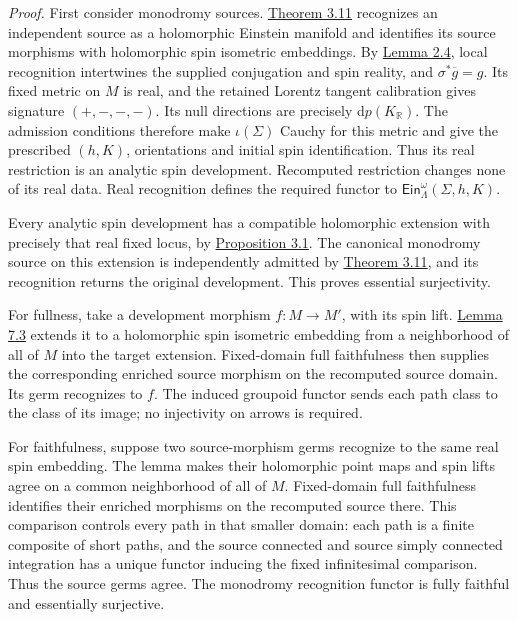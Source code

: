 \documentclass[
  english,
  11pt,
  reqno]{amsart}
\newcounter{none} %
\begin{document}
\emph{Proof.} First consider monodromy sources.
\hyperref[thm:independent-monodromy-equivalence]{Theorem 3.11}
recognizes an independent source as a holomorphic Einstein manifold and
identifies its source morphisms with holomorphic spin isometric
embeddings. By
\hyperref[lem:independent-ray-lorentz-recognition-v092]{Lemma 2.4},
local recognition intertwines the supplied conjugation and spin reality,
and \(\sigma^*\overline g=g\). Its fixed metric on \(M\) is real, and
the retained Lorentz tangent calibration gives signature \((+,-,-,-)\).
Its null directions are precisely \(\mathrm dp(K_{\mathbb R})\). The
admission conditions therefore make \(\iota(\Sigma)\) Cauchy for this
metric and give the prescribed \((h,K)\), orientations and initial spin
identification. Thus its real restriction is an analytic spin
development. Recomputed restriction changes none of its real data. Real
recognition defines the required functor to
\(\mathsf{Ein}^{\omega}_\Lambda(\Sigma,h,K)\).

Every analytic spin development has a compatible holomorphic extension
with precisely that real fixed locus, by
\hyperref[prop:einstein-complexification-phase]{Proposition 3.1}. The
canonical monodromy source on this extension is independently admitted
by \hyperref[thm:independent-monodromy-equivalence]{Theorem 3.11}, and
its recognition returns the original development. This proves essential
surjectivity.

For fullness, take a development morphism \(f:M\to M'\), with its spin
lift. \hyperref[lem:whole-real-isometry-complexification]{Lemma 7.3}
extends it to a holomorphic spin isometric embedding from a neighborhood
of all of \(M\) into the target extension. Fixed-domain full
faithfulness then supplies the corresponding enriched source morphism on
the recomputed source domain. Its germ recognizes to \(f\). The induced
groupoid functor sends each path class to the class of its image; no
injectivity on arrows is required.

For faithfulness, suppose two source-morphism germs recognize to the
same real spin embedding. The lemma makes their holomorphic point maps
and spin lifts agree on a common neighborhood of all of \(M\).
Fixed-domain full faithfulness identifies their enriched morphisms on
the recomputed source there. This comparison controls every path in that
smaller domain: each path is a finite composite of short paths, and the
source connected and source simply connected integration has a unique
functor inducing the fixed infinitesimal comparison. Thus the source
germs agree. The monodromy recognition functor is fully faithful and
essentially surjective.
\end{document}
